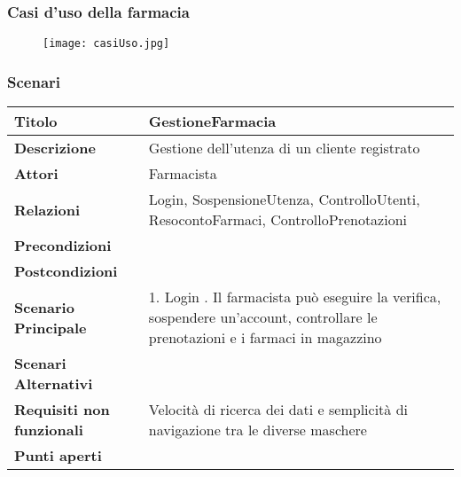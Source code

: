 \newpage %
\subsubsection{Casi d'uso della farmacia}

\begin{figure}[h!]
  \begin{center}
      \texttt{[image: casiUso.jpg]}
  \end{center}
\end{figure}

\newpage %
\subsubsection{Scenari}
\hfill \break

\begin{tabular} {|P{4.5cm}|P{12.5cm}|}
\hline  
  \textbf{Titolo} & GestioneFarmacia \\
\hline
  \textbf{Descrizione} & Gestione dell'utenza di un cliente registrato \\
\hline
  \textbf{Attori} & Farmacista\\
\hline
  \textbf{Relazioni} & Login, SospensioneUtenza, ControlloUtenti, ResocontoFarmaci, ControlloPrenotazioni\\
\hline
  \textbf{Precondizioni} & \\
\hline
  \textbf{Postcondizioni} & \\
\hline
  \textbf{Scenario Principale} & 1. Login . Il farmacista può eseguire la verifica, sospendere un'account, controllare le prenotazioni e i farmaci in magazzino\\
\hline
  \textbf{Scenari Alternativi} &\\
\hline
  \textbf{Requisiti non funzionali} & Velocità di ricerca dei dati e semplicità di navigazione tra le diverse maschere\\
\hline
  \textbf{Punti aperti} &\\
\hline
\end{tabular}
\hfill
\break

